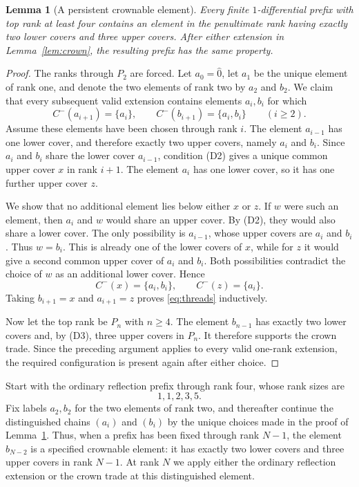 \documentclass[11pt]{amsart}
\newtheorem{lemma}[theorem]{Lemma}
\theoremstyle{remark}
\newcommand{\cminus}{C^{-}}
\begin{document}
\begin{lemma}[A persistent crownable element]\label{lem:persistent}
Every finite $1$-differential prefix with top rank at least four contains an element in the penultimate rank having exactly two lower covers and three upper covers. After either extension in Lemma~\ref{lem:crown}, the resulting prefix has the same property.
\end{lemma}

\begin{proof}
The ranks through $P_2$ are forced. Let $a_0=\widehat{0}$, let $a_1$ be the unique element of rank one, and denote the two elements of rank two by $a_2$ and $b_2$. We claim that every subsequent valid extension contains elements $a_i,b_i$ for which
\begin{equation}
\cminus(a_{i+1})=\{a_i\},
\qquad
\cminus(b_{i+1})=\{a_i,b_i\}
\qquad (i\geq2).
\label{eq:threads}
\end{equation}
Assume these elements have been chosen through rank $i$. The element $a_{i-1}$ has one lower cover, and therefore exactly two upper covers, namely $a_i$ and $b_i$. Since $a_i$ and $b_i$ share the lower cover $a_{i-1}$, condition (D2) gives a unique common upper cover $x$ in rank $i+1$. The element $a_i$ has one lower cover, so it has one further upper cover $z$.

We show that no additional element lies below either $x$ or $z$. If $w$ were such an element, then $a_i$ and $w$ would share an upper cover. By (D2), they would also share a lower cover. The only possibility is $a_{i-1}$, whose upper covers are $a_i$ and $b_i$. Thus $w=b_i$. This is already one of the lower covers of $x$, while for $z$ it would give a second common upper cover of $a_i$ and $b_i$. Both possibilities contradict the choice of $w$ as an additional lower cover. Hence
\[
\cminus(x)=\{a_i,b_i\},
\qquad
\cminus(z)=\{a_i\}.
\]
Taking $b_{i+1}=x$ and $a_{i+1}=z$ proves \eqref{eq:threads} inductively.

Now let the top rank be $P_n$ with $n\geq4$. The element $b_{n-1}$ has exactly two lower covers and, by (D3), three upper covers in $P_n$. It therefore supports the crown trade. Since the preceding argument applies to every valid one-rank extension, the required configuration is present again after either choice.
\end{proof}

Start with the ordinary reflection prefix through rank four, whose rank sizes are
\[
1,1,2,3,5.
\]
Fix labels $a_2,b_2$ for the two elements of rank two, and thereafter continue the distinguished chains $(a_i)$ and $(b_i)$ by the unique choices made in the proof of Lemma~\ref{lem:persistent}. Thus, when a prefix has been fixed through rank $N-1$, the element $b_{N-2}$ is a specified crownable element: it has exactly two lower covers and three upper covers in rank $N-1$. At rank $N$ we apply either the ordinary reflection extension or the crown trade at this distinguished element.
\end{document}
